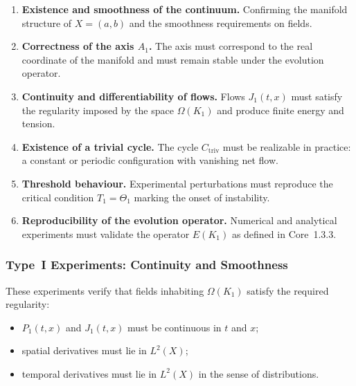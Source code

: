 \begin{enumerate}
    \item \textbf{Existence and smoothness of the continuum.}  
          Confirming the manifold structure of $X=(a,b)$
          and the smoothness requirements on fields.

    \item \textbf{Correctness of the axis $A_1$.}  
          The axis must correspond to the real coordinate of the 
          manifold and must remain stable under the evolution operator.

    \item \textbf{Continuity and differentiability of flows.}  
          Flows $J_1(t,x)$ must satisfy the regularity imposed by the 
          space $\Omega(K_1)$ and produce finite energy and tension.

    \item \textbf{Existence of a trivial cycle.}  
          The cycle $C_{\mathrm{triv}}$ must be realizable in practice:
          a constant or periodic configuration with vanishing net flow.

    \item \textbf{Threshold behaviour.}  
          Experimental perturbations must reproduce the critical 
          condition $T_1 = \Theta_1$ marking the onset of instability.

    \item \textbf{Reproducibility of the evolution operator.}  
          Numerical and analytical experiments must validate the 
          operator $E(K_1)$ as defined in Core~1.3.3.
\end{enumerate}


\subsubsection{Type~I Experiments: Continuity and Smoothness}

These experiments verify that fields inhabiting $\Omega(K_1)$ satisfy the
required regularity:

\begin{itemize}
    \item $P_1(t,x)$ and $J_1(t,x)$ must be continuous in $t$ and $x$;
    \item spatial derivatives must lie in $L^2(X)$;
    \item temporal derivatives must lie in $L^2(X)$ in the sense of 
          distributions.
\end{itemize}

